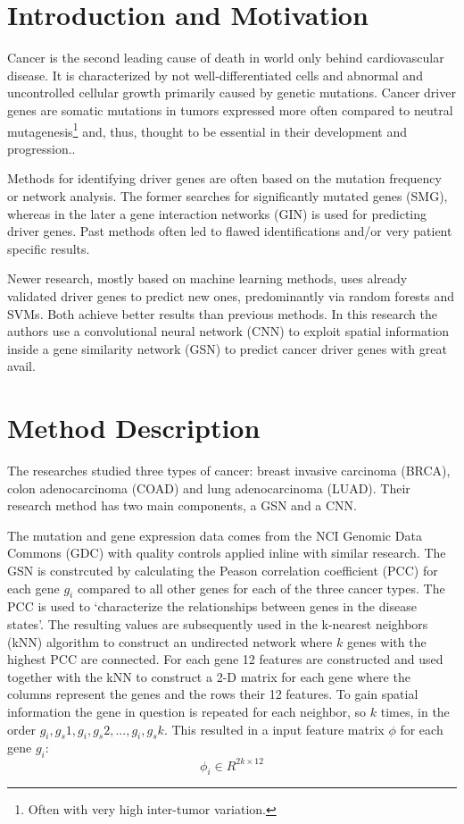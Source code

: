 \documentclass[10pt]{article}
\begin{document}
\vspace*{-6mm}
\section*{Introduction and Motivation}
Cancer is the second leading cause of death in world only behind cardiovascular disease\cite{globalCancerStats}. It is characterized by not well-differentiated cells and abnormal and uncontrolled cellular growth primarily caused by genetic mutations. Cancer driver genes are somatic mutations in tumors expressed more often compared to neutral mutagenesis\footnote{Often with very high inter-tumor variation.} and, thus, thought to be essential in their development and progression.\cite{cancerGenome}.   

Methods for identifying driver genes are often based on the mutation frequency or network analysis. The former searches for significantly mutated genes (SMG), whereas in the later a gene interaction networks (GIN) is used for predicting driver genes. Past methods often led to flawed identifications and/or very patient specific results. 

Newer research, mostly based on machine learning methods, uses already validated driver genes to predict new ones, predominantly via random forests and SVMs. Both achieve better results than previous methods. In this research the authors use a convolutional neural network (CNN) to exploit spatial information inside a gene similarity network (GSN) to predict cancer driver genes with great avail.  

\section*{Method Description}
The researches studied three types of cancer: breast invasive carcinoma (BRCA), colon adenocarcinoma (COAD) and lung adenocarcinoma (LUAD). Their research method has two main components, a GSN and a CNN.  

The mutation and gene expression data comes from the NCI Genomic Data Commons (GDC) with quality controls applied inline with similar research. The GSN is constrcuted by calculating the Peason correlation coefficient (PCC) for each gene $g_i$ compared to all other genes for each of the three cancer types. 
The PCC is used to `characterize the relationships between genes in the disease states'.  
The resulting values are subsequently used in the k-nearest neighbors (kNN) algorithm to construct an undirected network where $k$ genes with the highest PCC are connected. 
For each gene 12 features are constructed and used together with the kNN to construct a 2-D matrix for each gene where the columns represent the genes and the rows their 12 features. 
To gain spatial information the gene in question is repeated for each neighbor, so $k$ times, in the order $g_i, g_s1,g_i,g_s2, ... , g_i,g_sk$. This resulted in a input feature matrix $\phi$ for each gene $g_i$:
\begin{equation}
\phi_i \in R^{2k \times 12}
\end{equation}  
\end{document}
